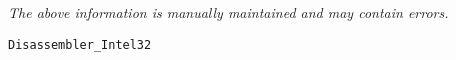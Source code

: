 \label{pkg:disassembler\_intel32}

{\tiny \it The above information is manually maintained and may contain errors.}
\begin{verbatim}
Disassembler_Intel32
\end{verbatim}
